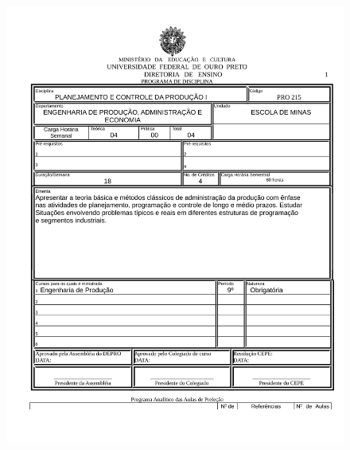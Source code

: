 \begin{figure}[p]
	\centering 
	\includegraphics[scale=0.7]{capitulos/anexo1-programas-disciplina/p103.pdf}
\end{figure}
\pagebreak

